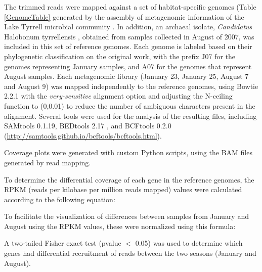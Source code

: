 The trimmed reads were mapped against a set of habitat-specific genomes (Table \ref{GenomeTable} generated by the assembly of metagenomic information of the Lake Tyrrell microbial community \cite{Narasingarao:2012kp,Podell:2013kx,Podell:2013fp}. In addition, an archaeal isolate, \textit{Candidatus} Halobonum tyrrellensis \cite{Ugalde:2013hb}, obtained from samples collected in August of 2007, was included in this set of reference genomes. Each genome is labeled based on their phylogenetic classification on the original work, with the prefix J07 for the genomes representing January samples, and A07 for the genomes that represent August samples. Each metagenomic library (January 23, January 25, August 7 and August 9) was mapped independently to the reference genomes, using Bowtie 2.2.1 \cite{Langmead:2012jh} with the \textit{very-sensitive} alignment option and adjusting the N-ceiling function to (0,0.01) to reduce the number of ambiguous characters present in the alignment. Several tools were used for the analysis of the resulting files, including SAMtools 0.1.19\cite{Li:2009ka}, BEDtools 2.17 \cite{Quinlan:2010km}, and BCFtools 0.2.0 (\url{http://samtools.github.io/bcftools/bcftools.html}).

Coverage plots were generated with custom Python scripts, using the BAM files generated by read mapping.

To determine the differential coverage of each gene in the reference genomes, the RPKM (reads per kilobase per million reads mapped) values were calculated according to the following equation:

\begin{center}
\end{center}

To facilitate the visualization of differences between samples from January and August using the RPKM values, these were normalized using this formula:

\begin{center}
\end{center}

A two-tailed Fisher exact test (pvalue $<$ 0.05) was used to determine which genes had differential recruitment of reads between the two seasons (January and August). 

